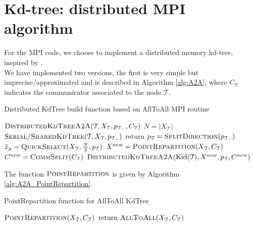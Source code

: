 \documentclass[amssymb, aps,nofootinbib, superscriptaddress, notitlepage]{revtex4}
\begin{document}
\section{Kd-tree: distributed MPI algorithm}
For the MPI code, we choose to implement a distributed memory kd-tree, inspired by \cite{xiao2016parallel}.
\\
We have implemented two versions, the first is very simple but imprecise/approximated and is described in Algorithm \ref{alg:A2A},  where $C_\mathcal{T}$ indicates the communicator associated to the node $\mathcal{T}$.

\begin{algorithm}
\caption{Distributed KdTree build function based on AllToAll MPI routine}\label{alg:A2A}
\begin{algorithmic}
\State  $\textsc{DistributedKdTreeA2A}(\mathcal{T},X_\mathcal{T},p_{\mathcal{T}_{-}},C_\mathcal{T})$
\State $N= |X_\mathcal{T}| $
 \State $\textsc{Serial/SharedKdTree}(\mathcal{T}, X_\mathcal{T},p_{\mathcal{T}_{-}})$
  \State $\text{return}$
  \EndIf
 \State $p_{\mathcal{T}}= \textsc{SplitDirection}(p_{\mathcal{T}_{-}})$
  \State $\tilde{x}_{p} = \textsc{QuickSelect}(X_\mathcal{T}, \frac{N}{2},p_{\mathcal{T}})$
   \State $X^{new} = \textsc{PointRepartition}(X_\mathcal{T}, C_\mathcal{T}) $
    \State $C^{new} = \textsc{CommSplit}(C_\mathcal{T})$
     \State $\textsc{DistributedKdTreeA2A}(\text{Kid}(\mathcal{T}),X^{new},p_{\mathcal{T}},C^{new})$
\end{algorithmic}
\end{algorithm}
 
The function $\textsc{PointRepartition}$ is given by Algorithm \ref{alg:A2A_PointRepartition}.

\begin{algorithm}
\caption{PointRepartition function for AllToAll KdTree}\label{alg:A2A_PointRepartition}
\begin{algorithmic}
\State  $\textsc{PointRepartition}(X_\mathcal{T}, C_\mathcal{T}) $
\State $\text{return} \ \textsc{AllToAll}(X_\mathcal{T}, C_\mathcal{T})$
\end{algorithmic}
\end{algorithm}
\end{document}
